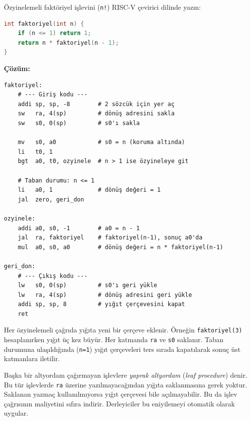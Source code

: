 \begin{ornek}[3.20]
\label{orn:faktoriyel}
Özyinelemeli faktöriyel işlevini (\texttt{n!}) RISC-V çevirici dilinde yazın:
\begin{lstlisting}[language=C]
int faktoriyel(int n) {
    if (n <= 1) return 1;
    return n * faktoriyel(n - 1);
}
\end{lstlisting}

\textbf{Çözüm:}
\begin{lstlisting}[style=riscv]
faktoriyel:
    # --- Giriş kodu ---
    addi sp, sp, -8        # 2 sözcük için yer aç
    sw   ra, 4(sp)         # dönüş adresini sakla
    sw   s0, 0(sp)         # s0'ı sakla

    mv   s0, a0            # s0 = n (koruma altında)
    li   t0, 1
    bgt  a0, t0, ozyinele  # n > 1 ise özyineleye git

    # Taban durumu: n <= 1
    li   a0, 1             # dönüş değeri = 1
    jal  zero, geri_don

ozyinele:
    addi a0, s0, -1        # a0 = n - 1
    jal  ra, faktoriyel    # faktoriyel(n-1), sonuç a0'da
    mul  a0, s0, a0        # dönüş değeri = n * faktoriyel(n-1)

geri_don:
    # --- Çıkış kodu ---
    lw   s0, 0(sp)         # s0'ı geri yükle
    lw   ra, 4(sp)         # dönüş adresini geri yükle
    addi sp, sp, 8         # yığıt çerçevesini kapat
    ret
\end{lstlisting}

Her özyinelemeli çağrıda yığıta yeni bir çerçeve eklenir. Örneğin \texttt{faktoriyel(3)} hesaplanırken yığıt üç kez büyür. Her katmanda \texttt{ra} ve \texttt{s0} saklanır. Taban durumuna ulaşıldığında (\texttt{n=1}) yığıt çerçeveleri ters sırada kapatılarak sonuç üst katmanlara iletilir.
\end{ornek}

\begin{bilginot}
Başka bir altyordam çağırmayan işlevlere \emph{yaprak altyordam} (\textit{leaf procedure}) denir. Bu tür işlevlerde \texttt{ra} üzerine yazılmayacağından yığıta saklanmasına gerek yoktur. Saklanan yazmaç kullanılmıyorsa yığıt çerçevesi bile açılmayabilir. Bu da işlev çağrısının maliyetini sıfıra indirir. Derleyiciler bu eniyilemeyi otomatik olarak uygular.
\end{bilginot}

